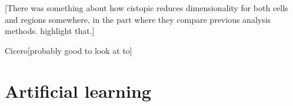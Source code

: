 	[There was something about how cistopic reduces dimensionality for both cells and regions somewhere, in the part where they compare previous analysis methods. highlight that.]

Cicero[probably good to look at to]


\section{Artificial learning}



